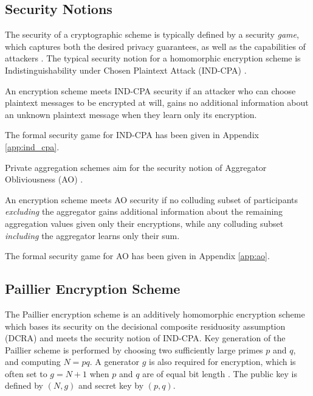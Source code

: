 \documentclass[twocolumn]{autart}
\begin{document}
\subsection{Security Notions}
The security of a cryptographic scheme is typically defined by a security \textit{game}, which captures both the desired privacy guarantees, as well as the capabilities of attackers \cite{katzIntroductionModernCryptography2008}. The typical security notion for a homomorphic encryption scheme is Indistinguishability under Chosen Plaintext Attack (IND-CPA) \cite{chaseSecurityHomomorphicEncryption2017}. 
\begin{defn}
An encryption scheme meets IND-CPA security if an attacker who can choose plaintext messages to be encrypted at will, gains no additional information about an unknown plaintext message when they learn only its encryption. 

The formal security game for IND-CPA has been given in Appendix \ref{app:ind_cpa}.
\end{defn}
Private aggregation schemes aim for the security notion of Aggregator Obliviousness (AO) \cite{shiPrivacyPreservingAggregationTimeSeries2011}. 
\begin{defn}
An encryption scheme meets AO security if no colluding subset of participants \textit{excluding} the aggregator gains additional information about the remaining aggregation values given only their encryptions, while any colluding subset \textit{including} the aggregator learns only their sum. 

The formal security game for AO has been given in Appendix \ref{app:ao}.
\end{defn}

% 
% 

\subsection{Paillier Encryption Scheme} \label{subsec:paillier_scheme}
The Paillier encryption scheme \cite{paillierPublicKeyCryptosystemsBased1999} is an additively homomorphic encryption scheme which bases its security on the decisional composite residuosity assumption (DCRA) and meets the security notion of IND-CPA. Key generation of the Paillier scheme is performed by choosing two sufficiently large primes $p$ and $q$, and computing $N=pq$. A generator $g$ is also required for encryption, which is often set to $g=N+1$ when $p$ and $q$ are of equal bit length \cite{katzIntroductionModernCryptography2008}. The public key is defined by $(N, g)$ and secret key by $(p, q)$.
\end{document}
